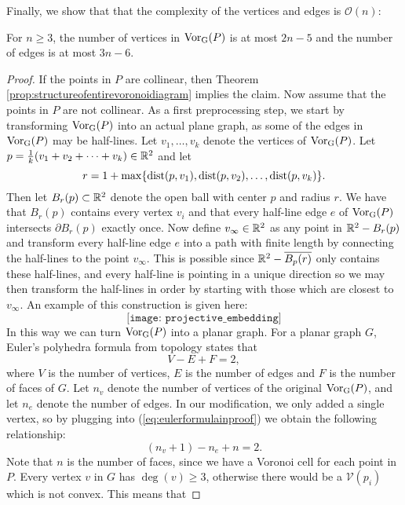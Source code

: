 Finally, we show that that the complexity of the vertices and edges is $\mathcal{O}(n)$:
\begin{thm} \label{thm:numberofvertsandedges}
For $n \geq 3$, the number of vertices in $\operatorname{Vor_{G}}(P)$ is at most $2n - 5$ and the number of edges is at most $3n - 6$.
\end{thm}
\begin{proof}
If the points in $P$ are collinear, then Theorem \ref{prop:structureofentirevoronoidiagram} implies the claim. Now assume that the points in $P$ are not collinear. As a first preprocessing step, we start by transforming $\operatorname{Vor_{G}}(P)$ into an actual plane graph, as some of the edges in $\operatorname{Vor_{G}}(P)$ may be half-lines. Let $v_1, \ldots, v_k$ denote the vertices of $\operatorname{Vor_{G}}(P)$. Let $p = \tfrac{1}{k}(v_1 + v_2 + \cdots + v_k) \in \mathbb{R}^2$ and let
\[
    r = 1 + \max\{\operatorname{dist}(p, v_1), \operatorname{dist}(p, v_2), \ldots, \operatorname{dist}(p, v_k)\}.
\]
Then let $B_r(p) \subset \mathbb{R}^2$ denote the open ball with center $p$ and radius $r$. We have that $B_r(p)$ contains every vertex $v_i$ and that every half-line edge $e$ of $\operatorname{Vor_{G}}(P)$ intersects $\partial B_r(p)$ exactly once. Now define $v_{\infty} \in \mathbb{R}^2$ as any point in $\mathbb{R}^2 - B_r(p)$ and transform every half-line edge $e$ into a path with finite length by connecting the half-lines to the point $v_{\infty}$. This is possible since $\mathbb{R}^2 - \overline{B_p(r)}$ only contains these half-lines, and every half-line is pointing in a unique direction so we may then transform the half-lines in order by starting with those which are closest to $v_{\infty}$. An example of this construction is given here:
\[
    \texttt{[image: projective\_embedding]} %
\]
In this way we can turn $\operatorname{Vor_{G}}(P)$ into a planar graph. For a planar graph $G$, Euler's polyhedra formula from topology states that
\begin{equation} \label{eq:eulerformulainproof}
    V - E + F = 2,
\end{equation}
where $V$ is the number of vertices, $E$ is the number of edges and $F$ is the number of faces of $G$. Let $n_v$ denote the number of vertices of the original $\operatorname{Vor_{G}}(P)$, and let $n_e$ denote the number of edges. In our modification, we only added a single vertex, so by plugging into (\ref{eq:eulerformulainproof}) we obtain the following relationship:
\begin{equation} \label{eq:eulersformulaapplied}
    (n_v + 1) - n_e + n = 2.
\end{equation}
Note that $n$ is the number of faces, since we have a Voronoi cell for each point in $P$. Every vertex $v$ in $G$ has $\deg(v) \geq 3$, otherwise there would be a $\mathcal{V}(p_i)$ which is not convex. This means that

\end{proof}
